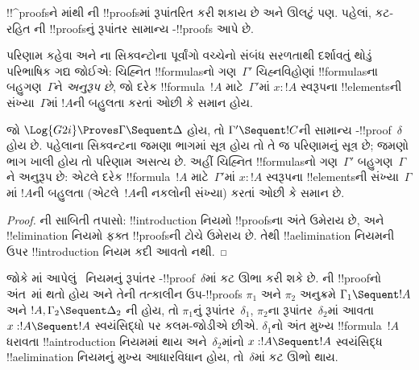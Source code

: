 \documentclass[../../../include/open-logic-section]{subfiles}
\begin{document}


!!^{proof}sને
માંથી
ની
!!{proof}sમાં
રૂપાંતરિત કરી
શકાય છે અને
ઊલટું પણ.
પહેલાં, કટ-રહિત
ની
!!{proof}sનું
રૂપાંતર સામાન્ય
-!!{proof}s
આપે છે.

પરિણામ કહેવા
 અને
ના
સિક્વન્ટોના
પૂર્વાંગો વચ્ચેનો
સંબંધ સરળતાથી
દર્શાવતું થોડું
પરિભાષિક ગદ્ય
જોઈએ: ચિહ્નિત
!!{formula}sનો
ગણ~$\Gamma'$
ચિહ્નવિહોણાં
!!{formula}sના
બહુગણ~$\Gamma$ને
\emph{અનુરૂપ છે},
જો દરેક
!!{formula}~$!A$
માટે~$\Gamma'$માં
$x : !A$
સ્વરૂપના
!!{element}sની
સંખ્યા~$\Gamma$માં
$!A$ની બહુલતા
કરતાં ઓછી કે
સમાન હોય.

\begin{cor}
જો
$\Log{G2i} \Proves \Gamma \Sequent \Delta$
હોય, તો
$\Gamma' \Sequent !C$ની
સામાન્ય
-!!{proof}~$\delta$
હોય છે. પહેલાના
સિક્વન્ટના જમણા
ભાગમાં સૂત્ર
હોય તો તે
જ પરિણામનું
સૂત્ર છે; જમણો
ભાગ ખાલી હોય
તો પરિણામ
અસત્ય છે.
અહીં
ચિહ્નિત
!!{formula}sનો
ગણ~$\Gamma'$
બહુગણ~$\Gamma$ને
અનુરૂપ છે:
એટલે દરેક
!!{formula}~$!A$
માટે~$\Gamma'$માં
$x : !A$
સ્વરૂપના
!!{element}sની
સંખ્યા~$\Gamma$માં
$!A$ની બહુલતા
(એટલે~$!A$ની
નકલોની સંખ્યા)
કરતાં ઓછી કે
સમાન છે.
\end{cor}

\begin{proof}
ની
સાબિતી તપાસો:
!!{introduction} નિયમો
!!{proof}sના
અંતે ઉમેરાય છે,
અને !!{elimination}
નિયમો ફક્ત
!!{proof}sની
ટોચે ઉમેરાય
છે. તેથી
!!a{elimination}
નિયમની ઉપર
!!{introduction}
નિયમ કદી
આવતો નથી.
\end{proof}

જોકે
માં
આપેલું~\Cut{}
નિયમનું રૂપાંતર
-!!{proof}~$\delta$માં
કટ ઊભા કરી
શકે છે.
ની
!!{proof}નો
અંત~\Cut{}માં
થતો હોય અને
તેની તત્કાલીન
ઉપ-!!{proof}s
$\pi_1$ અને
$\pi_2$ અનુક્રમે
$\Gamma_1
\Sequent !A$
અને
$!A, \Gamma_2 \Sequent \Delta_2$
ની હોય, તો
$\pi_1$નું
રૂપાંતર~$\delta_1$,
$\pi_2$ના
રૂપાંતર~$\delta_2$માં
આવતા
$x:!A
\Sequent !A$
સ્વયંસિદ્ધો પર
કલમ-જોડીએ છીએ.
$\delta_1$નો
અંત મુખ્ય
!!{formula}~$!A$
ધરાવતા
!!a{introduction}
નિયમમાં થાય
અને~$\delta_2$માંનો
$x:!A \Sequent !A$
સ્વયંસિદ્ધ
!!a{elimination}
નિયમનું મુખ્ય
આધારવિધાન હોય,
તો~$\delta$માં
કટ ઊભો થાય.
\end{document}
